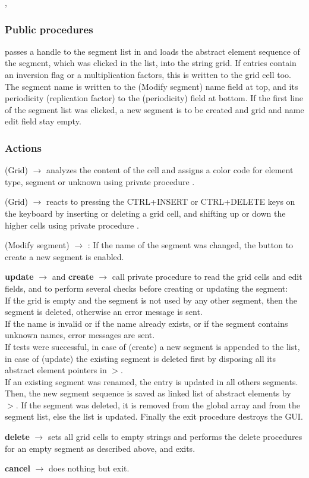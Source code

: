 \documentclass[12pt]{article}
\newcommand\code[1]{{\tt #1}}
\newcommand{\ofld}[1]{\colorbox{black!15}{{\bf #1}}}
\newcommand{\ofldx}[1]{\colorbox{black!15}{(#1)}}
\newcommand\guico[1]{{\color{blue}\code{#1}}}
\newcommand{\unico}[1]{{\color{burntorange}\code{#1}}}
\newcommand{\evcod}[2]{\ofld{#1} $\rightarrow$ \guico{#2}}
\newcommand{\evcodx}[2]{\ofldx{#1} $\rightarrow$ \guico{#2}}
\newcommand{\prcod}[2]{\opauni{#1}$>$\unico{#2}}
\newcommand{\opagui}[1]{\colorbox{blue!20}{{\color{black}\code{#1}}}}
\newcommand{\ogui}[1]{\hyperref[#1]{\opagui{#1}}}
\newcommand{\opauni}[1]{\colorbox{orange!30}{{\color{black}\code{#1}}}}
\newcommand{\ouni}[1]{\hyperref[#1]{\opauni{#1}}}
\newcommand{\uses}[1]{\flushleft {\bf Uses:} #1}
\newcommand{\act}[1]{\subsubsection*{Actions} #1}
\newcommand{\ppro}[1]{\subsubsection*{Public procedures} #1}
\begin{document}
\uses{\ouni{globlib}, \ouni{../com/asaux}}

\ppro{
\guico{Init} passes a handle to the segment list in \ogui{opaeditor} and loads the abstract element sequence of the segment, which was clicked in the list, into the string grid. If entries contain an inversion flag or a multiplication factors, this is written to the grid cell too. The segment name is written to the \ofldx{Modify segment} name field at top, and its periodicity (replication factor) to the \ofldx{periodicity} field at bottom. If the first line of the segment list was clicked, a new segment is to be created and grid and name edit field stay empty.
}
\act{
\evcodx{Grid}{drawCell} analyzes the content of the cell and assigns a color code for element type, segment or unknown using private procedure \guico{ElemCol\_C}.

\evcodx{Grid}{gridKeyDown} reacts to pressing the CTRL+INSERT or CTRL+DELETE keys on the keyboard by inserting or deleting a grid cell, and shifting up or down the higher cells using private procedure \guico{ShiftCells}.

\evcodx{Modify segment}{EditSegNameChange}: If the name of the segment was changed, the button to create a new segment is enabled.

\evcod{update}{butokClick} and \evcod{create}{butcreClick} call private procedure \guico{SaveSeg} to read the grid cells and edit fields, and to perform several checks before creating or updating the segment:\\
If the grid is empty and the segment is not used by any other segment, then the segment is deleted, otherwise an error message is sent.\\
If the name is invalid or if the name already exists, or if the  segment contains unknown names, error messages are sent.\\
If tests were successful, in case of \ofldx{create} a new segment is appended to the list, in case of \ofldx{update} the existing segment is deleted first by disposing all its abstract element pointers in \prcod{globlib}{ClearSeg}.\\
If an existing segment was renamed, the entry is updated in all others segments. Then, 
the new segment sequence is saved as linked list of abstract elements by \prcod{globlib}{AppendAE}. If the segment was deleted, it is removed from the global \unico{Segm} array and from the \ogui{opaeditor} segment list, else the list is updated. Finally the exit procedure destroys the GUI.

\evcod{delete}{butdelClick} sets all grid cells to empty strings and performs the delete procedures for an empty segment as described above, and exits.

\evcod{cancel}{butcanClick} does nothing but exit.
}
\end{document}
